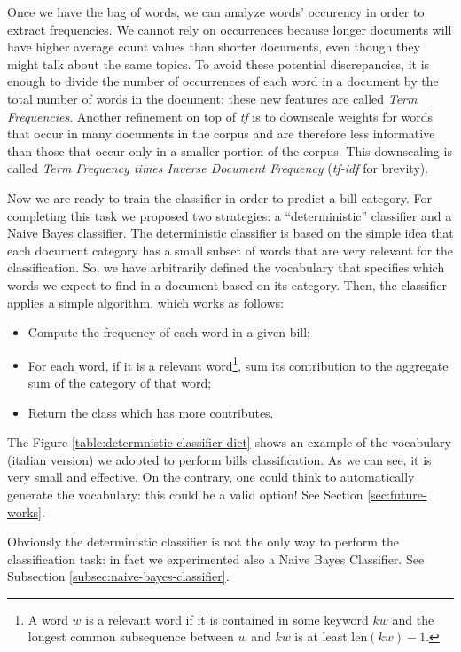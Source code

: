 \documentclass[10pt,twocolumn,letterpaper]{article}
\begin{document}
Once we have the bag of words, we can analyze words' occurency in
order to extract frequencies. We cannot rely on occurrences because
longer documents will have higher average count values than shorter
documents, even though they might talk about the same topics. To avoid
these potential discrepancies, it is enough to divide the number of
occurrences of each word in a document by the total number of words in
the document: these new features are called \emph{Term
  Frequencies}. Another refinement on top of \emph{tf} is to downscale
weights for words that occur in many documents in the corpus and are
therefore less informative than those that occur only in a smaller
portion of the corpus. This downscaling is called \emph{Term Frequency
  times Inverse Document Frequency} (\emph{tf-idf} for brevity).

Now we are ready to train the classifier in order to predict a bill
category. For completing this task we proposed two strategies: a
``deterministic'' classifier and a Naive Bayes classifier. The
deterministic classifier is based on the simple idea that each
document category has a small subset of words that are very relevant
for the classification. So, we have arbitrarily defined the vocabulary
that specifies which words we expect to find in a document based on
its category. Then, the classifier applies a simple algorithm, which
works as follows:

\begin{itemize}
  \item Compute the frequency of each word in a given bill;
  \item For each word, if it is a relevant word\footnote{A word $w$ is
    a relevant word if it is contained in some keyword $kw$ and the
    longest common subsequence between $w$ and $kw$ is at least
    $\mathrm{len}(kw) - 1$.}, sum its contribution to the aggregate
    sum of the category of that word;
  \item Return the class which has more contributes.
\end{itemize}

The Figure \ref{table:determnistic-classifier-dict} shows an example
of the vocabulary (italian version) we adopted to perform bills
classification. As we can see, it is very small and effective.  On the
contrary, one could think to automatically generate the vocabulary:
this could be a valid option! See Section \ref{sec:future-works}.

Obviously the deterministic classifier is not the only way to perform
the classification task: in fact we experimented also a Naive Bayes
Classifier. See Subsection \ref{subsec:naive-bayes-classifier}.
\end{document}
